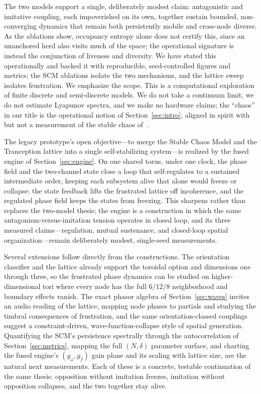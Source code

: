 \documentclass[11pt]{article}
\begin{document}
The two models support a single, deliberately modest claim: antagonistic and imitative coupling, each impoverished
on its own, together sustain bounded, non-converging dynamics that remain both persistently mobile and cross-node
diverse. As the ablations show, occupancy entropy alone does not certify this, since an unanchored herd also visits
much of the space; the operational signature is instead the conjunction of liveness and diversity. We have stated this
operationally and backed it with reproducible, seed-controlled figures and metrics; the SCM ablations isolate the
two mechanisms, and the lattice sweep isolates frustration. We emphasize the scope. This is a computational
exploration of finite discrete and semi-discrete models. We do not take a continuum limit, we do not estimate
Lyapunov spectra, and we make no hardware claims; the ``chaos'' in our title is the operational notion of
Section~\ref{sec:intro}, aligned in spirit with but not a measurement of the stable chaos of~\cite{politi2010}.

The legacy prototype's open objective---to merge the Stable Chaos Model and the Tranception lattice into a single
self-stabilizing system---is realized by the fused engine of Section~\ref{sec:engine}. On one shared torus, under one
clock, the phase field and the two-channel state close a loop that self-regulates to a sustained intermediate order,
keeping each subsystem alive that alone would freeze or collapse: the state feedback lifts the frustrated lattice off
incoherence, and the regulated phase field keeps the states from freezing. This sharpens rather than replaces the
two-model thesis; the engine is a construction in which the same antagonism-versus-imitation tension operates in closed
loop, and its three measured claims---regulation, mutual sustenance, and closed-loop spatial organization---remain
deliberately modest, single-seed measurements.

Several extensions follow directly from the constructions. The orientation classifier and the lattice already
support the toroidal option and dimensions one through three, so the frustrated phase dynamics can be studied on
higher-dimensional tori where every node has the full $6/12/8$ neighborhood and boundary effects vanish. The exact
phasor algebra of Section~\ref{sec:waves} invites an audio reading of the lattice, mapping node phases to partials
and studying the timbral consequences of frustration, and the same orientation-classed couplings suggest a
constraint-driven, wave-function-collapse style of spatial generation. Quantifying the SCM's persistence spectrally
through the autocorrelation of Section~\ref{sec:metrics}, mapping the full $(N,\delta)$ parameter surface, and charting
the fused engine's $(g_\omega,g_f)$ gain plane and its scaling with lattice size, are the natural next measurements. Each of these is a concrete, testable continuation of the same thesis: opposition
without imitation freezes, imitation without opposition collapses, and the two together stay alive.
\end{document}
